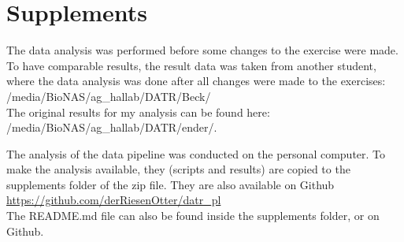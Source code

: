 \chapter*{Supplements}
The data analysis was performed before some changes to the exercise were made. To have comparable
results, the result data was taken from another student, where the data analysis was done after
all changes were made to the exercises: \\ 
/media/BioNAS/ag\_hallab/DATR/Beck/ \\ 
\newline
The original results for my analysis can be found here: 
\\ /media/BioNAS/ag\_hallab/DATR/ender/. \\ 
\newline

The analysis of the data pipeline was conducted on the personal computer. To make the analysis available,
they (scripts and results) are copied to the 
supplements folder of the zip file. They are also available on Github \href{https://github.com/derRiesenOtter/datr\_pl}{https://github.com/derRiesenOtter/datr\_pl} \\
\newline
The README.md file can also be found inside the supplements folder, or on Github.

\pagebreak

